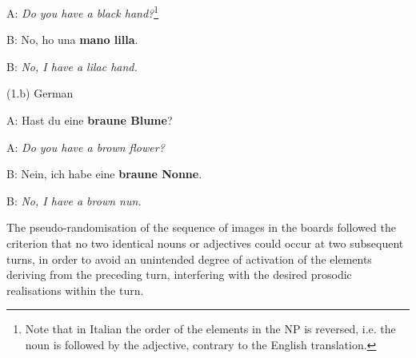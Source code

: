 \begin{styleTextbody}
A: \textit{Do you have a black hand?}\footnote{Note that in Italian the order of the elements in the NP is reversed, i.e. the noun is followed by the adjective, contrary to the English translation.}
\end{styleTextbody}

\begin{styleTextbody}
B: No, ho una \textbf{mano lilla}.
\end{styleTextbody}

\begin{styleTextbody}
B: \textit{No, I have a lilac hand.}
\end{styleTextbody}

\begin{styleTextbody}
(1.b) German
\end{styleTextbody}

\begin{styleTextbody}
A:\textit{ }Hast du eine \textbf{braune Blume}?
\end{styleTextbody}

\begin{styleTextbody}
A: \textit{Do you have a brown flower?}
\end{styleTextbody}

\begin{styleTextbody}
B: Nein, ich habe eine\textbf{ braune Nonne}.
\end{styleTextbody}

\begin{styleTextbody}
B: \textit{No, I have a brown nun.}
\end{styleTextbody}

\begin{styleStandard}
The pseudo-randomisation of the sequence of images in the boards followed the criterion that no two identical nouns or adjectives could occur at two subsequent turns, in order to avoid an unintended degree of activation of the elements deriving from the preceding turn, interfering with the desired prosodic realisations within the turn.
\end{styleStandard}

\begin{styleStandard}
  [Warning: Image ignored] %
 
\end{styleStandard}

